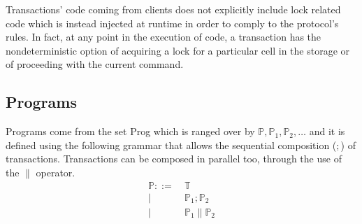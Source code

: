 Transactions' code coming from clients does not explicitly include lock related code which is instead injected at runtime in order to comply to the protocol's rules. In fact, at any point in the execution of code, a transaction has the nondeterministic option of acquiring a lock for a particular cell in the storage or of proceeding with the current command.

\subsection{Programs}

Programs come from the set \textsf{Prog} which is ranged over by $\mathds{P}, \mathds{P}_1, \mathds{P}_2, \ldots$ and it is defined using the following grammar that allows the sequential composition ($;$) of transactions. Transactions can be composed in parallel too, through the use of the $\|$ operator.
\begin{align*}
\mathds{P} ::=&
\ \mathds{T} \\
|&\ \mathds{P}_1; \mathds{P}_2 \\
|&\ \mathds{P}_1 \| \mathds{P}_2
\end{align*}